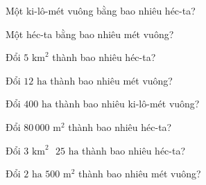 
\begin{ex}
  Một ki-lô-mét vuông bằng bao nhiêu héc-ta?
\end{ex}

\begin{ex}
  Một héc-ta bằng bao nhiêu mét vuông?
\end{ex}

\begin{ex}
  Đổi $5\text{ km}^2$ thành bao nhiêu héc-ta?
\end{ex}

\begin{ex}
  Đổi $12\text{ ha}$ thành bao nhiêu mét vuông?
\end{ex}

\begin{ex}
  Đổi $400\text{ ha}$ thành bao nhiêu ki-lô-mét vuông?
\end{ex}

\begin{ex}
  Đổi $80\,000\text{ m}^2$ thành bao nhiêu héc-ta?
\end{ex}

\begin{ex}
  Đổi $3\text{ km}^2\text{ } 25\text{ ha}$ thành bao nhiêu héc-ta?
\end{ex}

\begin{ex}
  Đổi $2\text{ ha } 500\text{ m}^2$ thành bao nhiêu mét vuông?
\end{ex}

